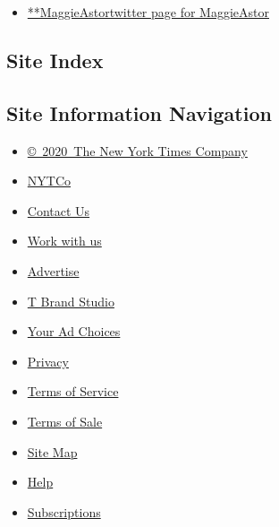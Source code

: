 \begin{itemize}
\tightlist
\item
  \href{https://twitter.com/MaggieAstor}{**MaggieAstortwitter page for
  MaggieAstor}
\end{itemize}

\hypertarget{site-index}{%
\subsection{Site Index}\label{site-index}}

\hypertarget{site-information-navigation}{%
\subsection{Site Information
Navigation}\label{site-information-navigation}}

\begin{itemize}
\tightlist
\item
  \href{https://help.nytimes3xbfgragh.onion/hc/en-us/articles/115014792127-Copyright-notice}{©~2020~The
  New York Times Company}
\end{itemize}

\begin{itemize}
\tightlist
\item
  \href{https://www.nytco.com/}{NYTCo}
\item
  \href{https://help.nytimes3xbfgragh.onion/hc/en-us/articles/115015385887-Contact-Us}{Contact
  Us}
\item
  \href{https://www.nytco.com/careers/}{Work with us}
\item
  \href{https://nytmediakit.com/}{Advertise}
\item
  \href{http://www.tbrandstudio.com/}{T Brand Studio}
\item
  \href{https://www.nytimes3xbfgragh.onion/privacy/cookie-policy\#how-do-i-manage-trackers}{Your
  Ad Choices}
\item
  \href{https://www.nytimes3xbfgragh.onion/privacy}{Privacy}
\item
  \href{https://help.nytimes3xbfgragh.onion/hc/en-us/articles/115014893428-Terms-of-service}{Terms
  of Service}
\item
  \href{https://help.nytimes3xbfgragh.onion/hc/en-us/articles/115014893968-Terms-of-sale}{Terms
  of Sale}
\item
  \href{https://spiderbites.nytimes3xbfgragh.onion}{Site Map}
\item
  \href{https://help.nytimes3xbfgragh.onion/hc/en-us}{Help}
\item
  \href{https://www.nytimes3xbfgragh.onion/subscription?campaignId=37WXW}{Subscriptions}
\end{itemize}
